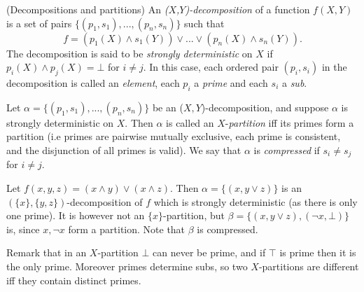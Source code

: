 \documentclass[11pt]{article}
\newenvironment{definition}[1][Definition]{\begin{trivlist}
\item[\hskip \labelsep {\bfseries #1}]}{\end{trivlist}}
\newenvironment{example}[1][Example]{\begin{trivlist}
\item[\hskip \labelsep {\bfseries #1}]}{\end{trivlist}}
\begin{document}
\begin{definition} (Decompositions and partitions)
An \textit{($X$,$Y$)-decomposition} of a function $f(X, Y)$ is a set of pairs $\{(p_1, s_1),...,(p_n, s_n)\}$ such that $$ f = (p_1(X) \land s_1(Y)) \lor ... \lor (p_n(X) \land s_n(Y)).$$
The decomposition is said to be \textit{strongly deterministic} on $X$ if $p_i(X) \land p_j(X) = \bot$ for $i \neq j$. In this case, each ordered pair $(p_i, s_i)$ in the decomposition is called an \textit{element}, each $p_i$ a \textit{prime} and each $s_i$ a \textit{sub}.

Let $\alpha = \{(p_1, s_1),...,(p_n, s_n)\}$ be an ($X,Y$)-decomposition, and suppose $\alpha$ is strongly deterministic on $X$.
Then $\alpha$ is called an $X$-\textit{partition} iff its primes form a partition (i.e primes are pairwise mutually exclusive, each prime is consistent, and the disjunction of all primes is valid).
We say that $\alpha$ is \textit{compressed} if $s_i \neq s_j$ for $i \neq j$.
\end{definition}

\begin{example} 
Let $f(x, y, z) = (x \land y) \lor (x \land z)$. Then $\alpha = \{(x, y\lor z)\}$ is an $(\{x\}, \{y, z\})$-decomposition of $f$ which is strongly deterministic (as there is only one prime). It is however not an $\{x\}$-partition, but $\beta = \{(x, y\lor z), (\lnot x, \bot)\}$ is, since $x, \lnot x$ form a partition. Note that $\beta$ is compressed. 
\end{example}

\noindent Remark that in an $X$-partition $\bot$ can never be prime, and if $\top$ is prime then it is the only prime. Moreover primes determine subs, so two $X$-partitions are different iff they contain distinct primes.
\end{document}
